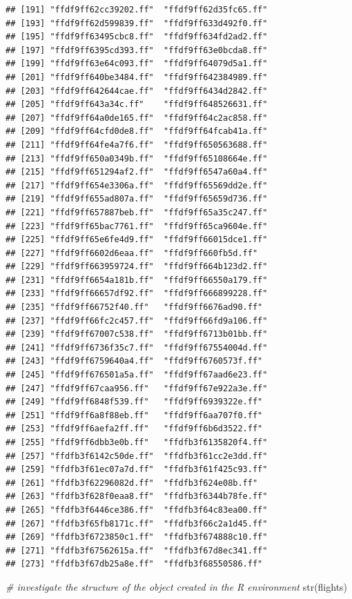 \documentclass[
  12pt,
]{style/krantz}
\newenvironment{Shaded}{\begin{snugshade}}{\end{snugshade}}
\newcommand{\CommentTok}[1]{\textcolor[rgb]{0.56,0.35,0.01}{\textit{#1}}}
\newcommand{\FunctionTok}[1]{\textcolor[rgb]{0.00,0.00,0.00}{#1}}
\newcommand{\NormalTok}[1]{#1}
\begin{document}
\begin{verbatim}
## [191] "ffdf9ff62cc39202.ff"  "ffdf9ff62d35fc65.ff" 
## [193] "ffdf9ff62d599839.ff"  "ffdf9ff633d492f0.ff" 
## [195] "ffdf9ff63495cbc8.ff"  "ffdf9ff634fd2ad2.ff" 
## [197] "ffdf9ff6395cd393.ff"  "ffdf9ff63e0bcda8.ff" 
## [199] "ffdf9ff63e64c093.ff"  "ffdf9ff64079d5a1.ff" 
## [201] "ffdf9ff640be3484.ff"  "ffdf9ff642384989.ff" 
## [203] "ffdf9ff642644cae.ff"  "ffdf9ff6434d2842.ff" 
## [205] "ffdf9ff643a34c.ff"    "ffdf9ff648526631.ff" 
## [207] "ffdf9ff64a0de165.ff"  "ffdf9ff64c2ac858.ff" 
## [209] "ffdf9ff64cfd0de8.ff"  "ffdf9ff64fcab41a.ff" 
## [211] "ffdf9ff64fe4a7f6.ff"  "ffdf9ff650563688.ff" 
## [213] "ffdf9ff650a0349b.ff"  "ffdf9ff65108664e.ff" 
## [215] "ffdf9ff651294af2.ff"  "ffdf9ff6547a60a4.ff" 
## [217] "ffdf9ff654e3306a.ff"  "ffdf9ff65569dd2e.ff" 
## [219] "ffdf9ff655ad807a.ff"  "ffdf9ff65659d736.ff" 
## [221] "ffdf9ff657887beb.ff"  "ffdf9ff65a35c247.ff" 
## [223] "ffdf9ff65bac7761.ff"  "ffdf9ff65ca9604e.ff" 
## [225] "ffdf9ff65e6fe4d9.ff"  "ffdf9ff66015dce1.ff" 
## [227] "ffdf9ff6602d6eaa.ff"  "ffdf9ff660fb5d.ff"   
## [229] "ffdf9ff663959724.ff"  "ffdf9ff664b123d2.ff" 
## [231] "ffdf9ff6654a181b.ff"  "ffdf9ff66550a179.ff" 
## [233] "ffdf9ff66657df92.ff"  "ffdf9ff666899228.ff" 
## [235] "ffdf9ff66752f40.ff"   "ffdf9ff6676ad90.ff"  
## [237] "ffdf9ff66fc2c457.ff"  "ffdf9ff66fd9a106.ff" 
## [239] "ffdf9ff67007c538.ff"  "ffdf9ff6713b01bb.ff" 
## [241] "ffdf9ff6736f35c7.ff"  "ffdf9ff67554004d.ff" 
## [243] "ffdf9ff6759640a4.ff"  "ffdf9ff6760573f.ff"  
## [245] "ffdf9ff676501a5a.ff"  "ffdf9ff67aad6e23.ff" 
## [247] "ffdf9ff67caa956.ff"   "ffdf9ff67e922a3e.ff" 
## [249] "ffdf9ff6848f539.ff"   "ffdf9ff6939322e.ff"  
## [251] "ffdf9ff6a8f88eb.ff"   "ffdf9ff6aa707f0.ff"  
## [253] "ffdf9ff6aefa2ff.ff"   "ffdf9ff6b6d3522.ff"  
## [255] "ffdf9ff6dbb3e0b.ff"   "ffdfb3f6135820f4.ff" 
## [257] "ffdfb3f6142c50de.ff"  "ffdfb3f61cc2e3dd.ff" 
## [259] "ffdfb3f61ec07a7d.ff"  "ffdfb3f61f425c93.ff" 
## [261] "ffdfb3f62296082d.ff"  "ffdfb3f624e08b.ff"   
## [263] "ffdfb3f628f0eaa8.ff"  "ffdfb3f6344b78fe.ff" 
## [265] "ffdfb3f6446ce386.ff"  "ffdfb3f64c83ea00.ff" 
## [267] "ffdfb3f65fb8171c.ff"  "ffdfb3f66c2a1d45.ff" 
## [269] "ffdfb3f6723850c1.ff"  "ffdfb3f674888c10.ff" 
## [271] "ffdfb3f67562615a.ff"  "ffdfb3f67d8ec341.ff" 
## [273] "ffdfb3f67db25a8e.ff"  "ffdfb3f68550586.ff"
\end{verbatim}

\begin{Shaded}
\begin{Highlighting}[]
\CommentTok{\# investigate the structure of the object created in the R environment}
\FunctionTok{str}\NormalTok{(flights)}
\end{Highlighting}
\end{Shaded}
\end{document}
